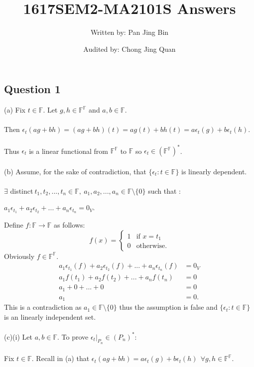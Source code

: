 \documentclass{article}
\title{1617SEM2-MA2101S Answers}
\author{Written by: Pan Jing Bin}
\date{Audited by: Chong Jing Quan}
\begin{document}
\maketitle

\subsection*{Question 1}
(a) Fix $t \in \mathbb{F}$. Let $g,h \in \mathbb{F}^\mathbb{F}$ and $a,b\in \mathbb{F}.$\\\\
Then $\epsilon_t(ag + bh) = (ag + bh)(t) = ag(t) + bh(t) = a\epsilon_t(g) + b\epsilon_t(h).$\\\\
Thus $\epsilon_t$ is a linear functional from $\mathbb{F}^\mathbb{F}$ to $\mathbb{F}$ so $\epsilon_t\in (\mathbb{F}^\mathbb{F})^*$.\\\\
(b) Assume, for the sake of contradiction, that $\{\epsilon_t : t\in \mathbb{F}\}$ is linearly dependent.\\\\
$\exists$ distinct$ \ t_1, t_2, ..., t_n \in \mathbb{F},\ a_1, a_2, ... ,a_n \in \mathbb{F}\setminus \{0\}$ such that :\begin{center}
    $a_1\epsilon_{t_1} + a_2\epsilon_{t_2} + ... + a_n\epsilon_{t_n} = 0_V$.
\end{center}
Define $f: \mathbb{F} \to \mathbb{F}$ as follows: \[f(x) = \begin{cases}
1 & \text{if }x = t_1 \\  0 & \text{otherwise.}
\end{cases}
\]Obviously $f \in \mathbb{F}^\mathbb{F}$.\begin{align*}
    a_1\epsilon_{t_1}(f) + a_2\epsilon_{t_2}(f) + ... + a_n\epsilon_{t_n}(f) &= 0_V \\
    a_1f(t_1) + a_2f(t_2) + ... + a_nf(t_n) &= 0  \\
    a_1 + 0 + ... + 0 &= 0 \\
    a_1 &= 0.
\end{align*}
This is a contradiction as $a_1 \in \mathbb{F}\setminus\{0\}$ thus the assumption is false and $\{\epsilon_t : t \in \mathbb{F}\}$ is an linearly independent set.\\\\
(c)(i) Let $a,b \in \mathbb{F}.$ To prove $\epsilon_t|_{P_n} \in (P_n)^*:$\\\\Fix $t \in \mathbb{F}$. Recall in (a) that $\epsilon_t(ag + bh) = a\epsilon_t(g) + b\epsilon_t(h)\ \ \forall g,h\in \mathbb{F}^\mathbb{F}.$\\\\
\end{document}
